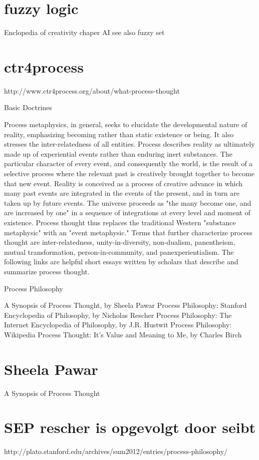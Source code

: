 \documentclass[a4paper]{Thesis}
\begin{document}
\section{fuzzy logic}
Enclopedia of creativity chaper AI
see also fuzzy set


\section{ctr4process}
http://www.ctr4process.org/about/what-process-thought

Basic Doctrines

Process metaphysics, in general, seeks to elucidate the developmental nature of reality, emphasizing becoming rather than static existence or being. It also stresses the inter-relatedness of all entities. Process describes reality as ultimately made up of experiential events rather than enduring inert substances. The particular character of every event, and consequently the world, is the result of a selective process where the relevant past is creatively brought together to become that new event. Reality is conceived as a process of creative advance in which many past events are integrated in the events of the present, and in turn are taken up by future events. The universe proceeds as "the many become one, and are increased by one" in a sequence of integrations at every level and moment of existence. Process thought thus replaces the traditional Western "substance metaphysic" with an "event metaphysic." Terms that further characterize process thought are inter-relatedness, unity-in-diversity, non-dualism, panentheism, mutual transformation, person-in-community, and panexperientialism. The following links are helpful short essays written by scholars that describe and summarize process thought.

Process Philosophy

A Synopsis of Process Thought, by Sheela Pawar
Process Philosophy: Stanford Encyclopedia of Philosophy, by Nicholas Rescher
Process Philosophy: The Internet Encyclopedia of Philosophy, by J.R. Hustwit
Process Philosophy: Wikipedia
Process Thought: It's Value and Meaning to Me, by Charles Birch


\section{Sheela Pawar}
A Synopsis of Process Thought


\section{SEP rescher is opgevolgt door seibt}
http://plato.stanford.edu/archives/sum2012/entries/process-philosophy/
\end{document}
